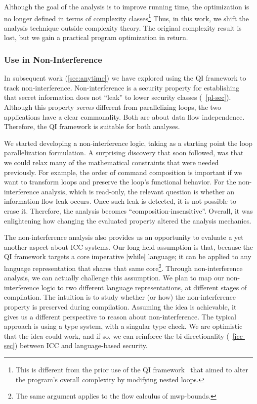 Although the goal of the analysis is to improve running time,
the optimization is no longer defined in terms of complexity classes\footnote{
This is different from the prior use of the QI framework~\cite{moyen20172}
that aimed to alter the program's overall complexity by modifying nested loops.}
Thus, in this work, we shift the analysis technique outside complexity theory.
The original complexity result is lost, but we gain a practical program optimization in return.

\subsubsection{Use in Non-Interference}
\label{subsubsec:qi-ni}

In subsequent work (\autoref{sec:anytime}) we have explored
using the QI framework to track non-interference.
Non-interference is a security property for establishing that secret information does not \enquote{leak} to lower security classes (\cf~\autoref{pl-sec}).
Although this property \emph{seems} different from parallelizing loops,
the two applications have a clear commonality.
Both are about data flow independence.
Therefore, the QI framework is suitable for both analyses.

We started developing a non-interference logic, taking as a starting point
the loop parallelization formulation.
A surprising discovery that soon followed, was that we could relax many of the mathematical constraints that were needed previously.
For example, the order of command composition is important if we want to
transform loops and preserve the loop's functional behavior.
For the non-interference analysis, which is read-only, the relevant question is whether an information flow leak occurs.
Once such leak is detected, it is not possible to erase it.
Therefore, the analysis becomes \enquote{composition-insensitive}.
Overall, it was enlightening how changing the evaluated property altered the analysis mechanics.

The non-interference analysis also provides us an opportunity to evaluate a yet another aspect about ICC systems.
Our long-held assumption is that, because the QI framework targets a core imperative \pr|while| language;
it can be applied to any language representation that shares that same core\footnote{The same argument applies to the flow calculus of mwp-bounds.}.
Through non-interference analysis, we can actually challenge this assumption.
We plan to map our non-interference logic to two different language representations, at different stages of compilation.
The intuition is to study whether (or how) the non-interference property is preserved during compilation.
Assuming the idea is achievable, it gives us a different perspective to reason about non-interference.
The typical approach is using a type system, with a singular type check.
We are optimistic that the idea could work, and if so,
we can reinforce the bi-directionality (\cf~\autoref{icc-sec}) between ICC and language-based security.


